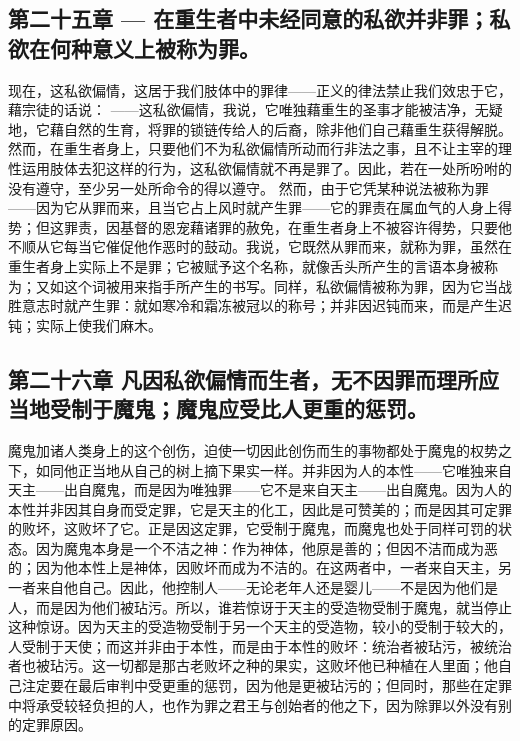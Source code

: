 
\subsection{第二十五章 — 在重生者中未经同意的私欲并非罪；私欲在何种意义上被称为罪。}

现在，这私欲偏情，这居于我们肢体中的罪律——正义的律法禁止我们效忠于它，藉宗徒的话说： ——这私欲偏情，我说，它唯独藉重生的圣事才能被洁净，无疑地，它藉自然的生育，将罪的锁链传给人的后裔，除非他们自己藉重生获得解脱。然而，在重生者身上，只要他们不为私欲偏情所动而行非法之事，且不让主宰的理性运用肢体去犯这样的行为，这私欲偏情就不再是罪了。因此，若在一处所吩咐的没有遵守，至少另一处所命令的得以遵守。 然而，由于它凭某种说法被称为罪——因为它从罪而来，且当它占上风时就产生罪——它的罪责在属血气的人身上得势；但这罪责，因基督的恩宠藉诸罪的赦免，在重生者身上不被容许得势，只要他不顺从它每当它催促他作恶时的鼓动。我说，它既然从罪而来，就称为罪，虽然在重生者身上实际上不是罪；它被赋予这个名称，就像舌头所产生的言语本身被称为；又如这个词被用来指手所产生的书写。同样，私欲偏情被称为罪，因为它当战胜意志时就产生罪：就如寒冷和霜冻被冠以的称号；并非因迟钝而来，而是产生迟钝；实际上使我们麻木。\par


\subsection{第二十六章 凡因私欲偏情而生者，无不因罪而理所应当地受制于魔鬼；魔鬼应受比人更重的惩罚。}

魔鬼加诸人类身上的这个创伤，迫使一切因此创伤而生的事物都处于魔鬼的权势之下，如同他正当地从自己的树上摘下果实一样。并非因为人的本性——它唯独来自天主——出自魔鬼，而是因为唯独罪——它不是来自天主——出自魔鬼。因为人的本性并非因其自身而受定罪，它是天主的化工，因此是可赞美的；而是因其可定罪的败坏，这败坏了它。正是因这定罪，它受制于魔鬼，而魔鬼也处于同样可罚的状态。因为魔鬼本身是一个不洁之神：作为神体，他原是善的；但因不洁而成为恶的；因为他本性上是神体，因败坏而成为不洁的。在这两者中，一者来自天主，另一者来自他自己。因此，他控制人——无论老年人还是婴儿——不是因为他们是人，而是因为他们被玷污。所以，谁若惊讶于天主的受造物受制于魔鬼，就当停止这种惊讶。因为天主的受造物受制于另一个天主的受造物，较小的受制于较大的，人受制于天使；而这并非由于本性，而是由于本性的败坏：统治者被玷污，被统治者也被玷污。这一切都是那古老败坏之种的果实，这败坏他已种植在人里面；他自己注定要在最后审判中受更重的惩罚，因为他是更被玷污的；但同时，那些在定罪中将承受较轻负担的人，也作为罪之君王与创始者的他之下，因为除罪以外没有别的定罪原因。\par

